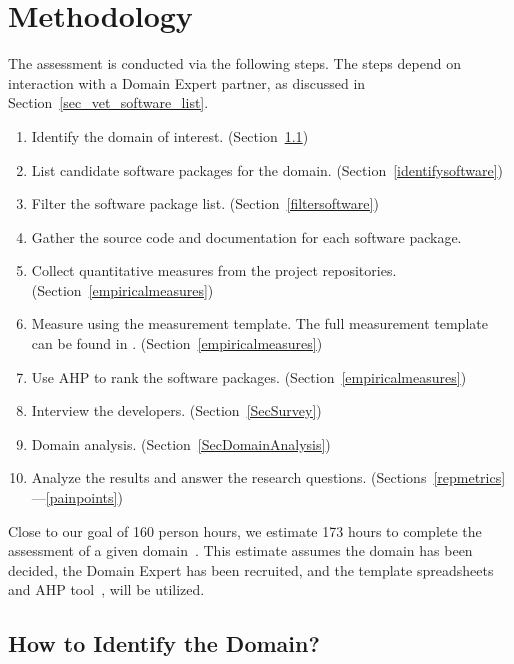 \documentclass[runningheads]{llncs}
\begin{document}
\section{Methodology} \label{methodology}

The assessment is conducted via the following steps.  The steps depend on
interaction with a Domain Expert partner, as discussed in
Section~\ref{sec_vet_software_list}.

\begin{enumerate}
  \item Identify the domain of interest. (Section~\ref{SecIdentifyDomain})
	\item List candidate software packages for the domain.
	(Section~\ref{identifysoftware})
	\item Filter the software package list. (Section~\ref{filtersoftware})
	\item Gather the source code and documentation for each software package.
	\item Collect quantitative measures from the project repositories.
	(Section~\ref{empiricalmeasures})
	\item Measure using the measurement template.  The full measurement template
	can be found in \cite{SmithEtAl2021}. (Section~\ref{empiricalmeasures})
	\item Use AHP to rank the software packages. (Section~\ref{empiricalmeasures})
	\item Interview the developers. (Section~\ref{SecSurvey})
    \item Domain analysis.  (Section~\ref{SecDomainAnalysis})
	\item Analyze the results and answer the research questions. (Sections~\ref{repmetrics}---\ref{painpoints}) %
\end{enumerate}

Close to our goal of 160 person hours, we estimate 173 hours to complete the
assessment of a given domain~\cite{SmithEtAl2021}.  This estimate assumes the
domain has been decided, the Domain Expert has been recruited, and the template
spreadsheets and AHP tool~\cite{SmithEtAl2021}, will be utilized.

\subsection{How to Identify the Domain?} \label{SecIdentifyDomain} 
\end{document}

